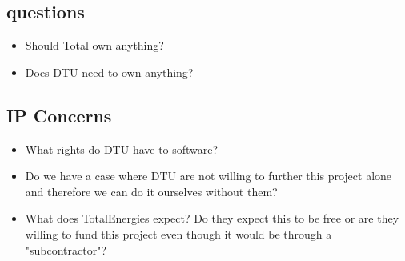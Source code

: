 \documentclass{article}
\begin{document}
\subsection{questions}
\begin{itemize}
    \item Should Total own anything?
    \item Does DTU need to own anything?
\end{itemize}

\subsection{IP Concerns}
\begin{itemize}
    \item What rights do DTU have to software?
    \item Do we have a case where DTU are not willing to further this project alone and therefore we can do it ourselves without them?
    \item What does TotalEnergies expect? Do they expect this to be free or are they willing to fund this project even though it would be through a "subcontractor"?
\end{itemize}
\end{document}
